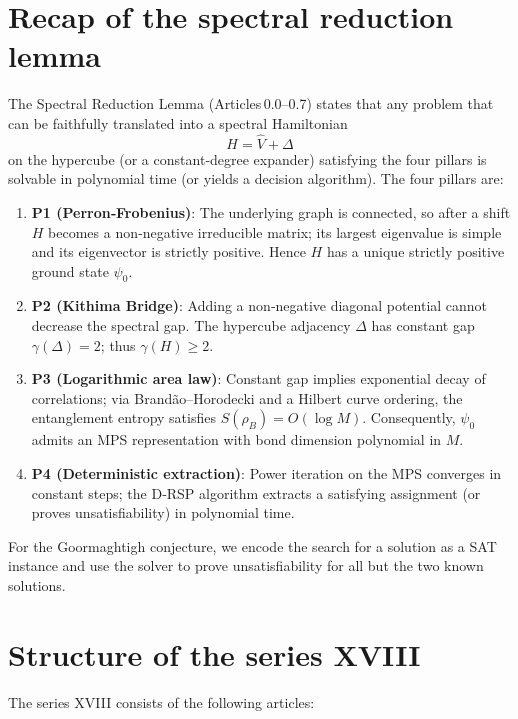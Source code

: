 \documentclass[11pt,a4paper]{article}
\begin{document}
\section{Recap of the spectral reduction lemma}

The Spectral Reduction Lemma (Articles 0.0–0.7) states that any problem that can be faithfully translated into a spectral Hamiltonian
\[
H = \hat{V} + \Delta
\]
on the hypercube (or a constant‑degree expander) satisfying the four pillars is solvable in polynomial time (or yields a decision algorithm). The four pillars are:

\begin{enumerate}
\item \textbf{P1 (Perron‑Frobenius)}: The underlying graph is connected, so after a shift \(H\) becomes a non‑negative irreducible matrix; its largest eigenvalue is simple and its eigenvector is strictly positive. Hence \(H\) has a unique strictly positive ground state \(\psi_0\).
\item \textbf{P2 (Kithima Bridge)}: Adding a non‑negative diagonal potential cannot decrease the spectral gap. The hypercube adjacency \(\Delta\) has constant gap \(\gamma(\Delta)=2\); thus \(\gamma(H) \ge 2\).
\item \textbf{P3 (Logarithmic area law)}: Constant gap implies exponential decay of correlations; via Brandão–Horodecki and a Hilbert curve ordering, the entanglement entropy satisfies \(S(\rho_B)=O(\log M)\). Consequently, \(\psi_0\) admits an MPS representation with bond dimension polynomial in \(M\).
\item \textbf{P4 (Deterministic extraction)}: Power iteration on the MPS converges in constant steps; the D‑RSP algorithm extracts a satisfying assignment (or proves unsatisfiability) in polynomial time.
\end{enumerate}

For the Goormaghtigh conjecture, we encode the search for a solution as a SAT instance and use the solver to prove unsatisfiability for all but the two known solutions.

\section{Structure of the series XVIII}

The series XVIII consists of the following articles:
\end{document}
